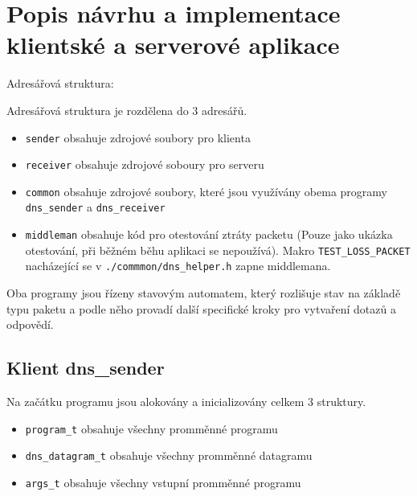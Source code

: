 

\section{Popis návrhu a implementace klientské a serverové aplikace}
\label{sec:popis-navrhu-a-implementace-klientske-a-serverove-aplikace}
Adresářová struktura:

Adresářová struktura je rozdělena do 3 adresářů.

\begin{itemize}
    \item \texttt{sender} \- obsahuje zdrojové soubory pro klienta
    \item \texttt{receiver} \- obsahuje zdrojové soboury pro serveru
    \item \texttt{common} \- obsahuje zdrojové soubory, které jsou využívány
    obema programy \texttt{dns\_sender} a \texttt{dns\_receiver}
    \item \texttt{middleman} \- obsahuje kód pro otestování ztráty
    packetu (Pouze jako ukázka otestování, při běžném běhu aplikaci se nepoužívá).
    Makro \texttt{TEST\_LOSS\_PACKET} nacházející se v
    \texttt{./commmon/dns\_helper.h} zapne middlemana.
\end{itemize}

Oba programy jsou řízeny stavovým automatem, který rozlišuje stav
na základě typu paketu a podle
něho provadí další specifické kroky pro vytvaření dotazů a odpovědí.



\subsection{Klient \- dns\_sender}
Na začátku programu jsou alokovány a inicializovány celkem 3 struktury.
\begin{itemize}
    \item \texttt{program\_t} \- obsahuje všechny promměnné programu
    \item \texttt{dns\_datagram\_t} \- obsahuje všechny promměnné datagramu
    \item \texttt{args\_t} \- obsahuje všechny vstupní promměnné programu
\end{itemize}

